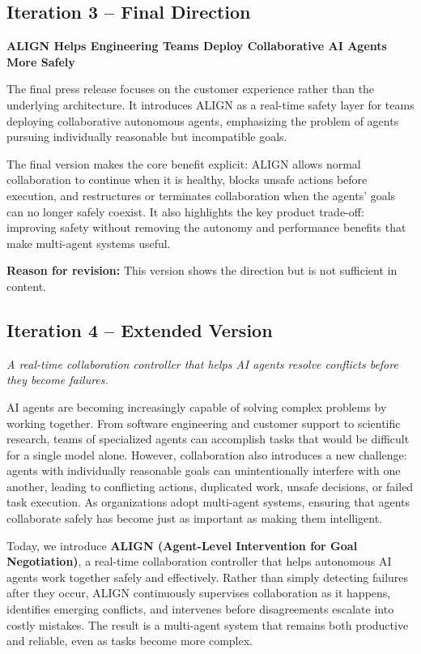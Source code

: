 \documentclass[11pt]{article}
\begin{document}
{\vspace{1em}

\subsection{Iteration 3 -- Final Direction}

\textbf{ALIGN Helps Engineering Teams Deploy Collaborative AI Agents More Safely}

The final press release focuses on the customer experience rather than the underlying architecture. It introduces ALIGN as a real-time safety layer for teams deploying collaborative autonomous agents, emphasizing the problem of agents pursuing individually reasonable but incompatible goals.

The final version makes the core benefit explicit: ALIGN allows normal collaboration to continue when it is healthy, blocks unsafe actions before execution, and restructures or terminates collaboration when the agents' goals can no longer safely coexist. It also highlights the key product trade-off: improving safety without removing the autonomy and performance benefits that make multi-agent systems useful.

\textbf{Reason for revision:} This version shows the direction but is not sufficient in content.

\vspace{1em}

\subsection{Iteration 4 -- Extended Version}

\textit{A real-time collaboration controller that helps AI agents resolve conflicts before they become failures.}

AI agents are becoming increasingly capable of solving complex problems by working together. From software engineering and customer support to scientific research, teams of specialized agents can accomplish tasks that would be difficult for a single model alone. However, collaboration also introduces a new challenge: agents with individually reasonable goals can unintentionally interfere with one another, leading to conflicting actions, duplicated work, unsafe decisions, or failed task execution. As organizations adopt multi-agent systems, ensuring that agents collaborate safely has become just as important as making them intelligent.

Today, we introduce \textbf{ALIGN (Agent-Level Intervention for Goal Negotiation)}, a real-time collaboration controller that helps autonomous AI agents work together safely and effectively. Rather than simply detecting failures after they occur, ALIGN continuously supervises collaboration as it happens, identifies emerging conflicts, and intervenes before disagreements escalate into costly mistakes. The result is a multi-agent system that remains both productive and reliable, even as tasks become more complex.

}
\end{document}
